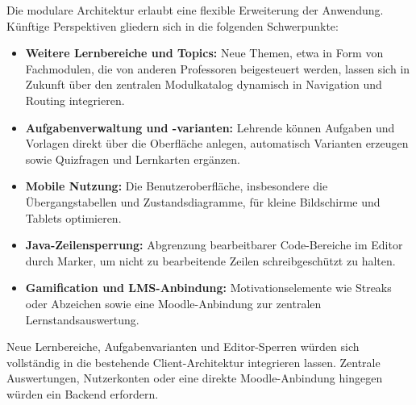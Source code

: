  \label{6_3_Perspektiven} \label{6_2_Perspektiven}

Die modulare Architektur erlaubt eine flexible Erweiterung der Anwendung. Künftige Perspektiven gliedern sich in die folgenden Schwerpunkte:

\begin{itemize}
    \item \textbf{Weitere Lernbereiche und Topics:} Neue Themen, etwa in Form von Fachmodulen, die von anderen Professoren beigesteuert werden, lassen sich in Zukunft über den zentralen Modulkatalog dynamisch in Navigation und Routing integrieren.
    \item \textbf{Aufgabenverwaltung und -varianten:} Lehrende können Aufgaben und Vorlagen direkt über die Oberfläche anlegen, automatisch Varianten erzeugen sowie Quizfragen und Lernkarten ergänzen.
    \item \textbf{Mobile Nutzung:} Die Benutzeroberfläche, insbesondere die Übergangstabellen und Zustandsdiagramme, für kleine Bildschirme und Tablets optimieren.
    \item \textbf{Java-Zeilensperrung:} Abgrenzung bearbeitbarer Code-Bereiche im Editor durch Marker, um nicht zu bearbeitende Zeilen schreibgeschützt zu halten.
    \item \textbf{Gamification und LMS-Anbindung:} Motivationselemente wie Streaks oder Abzeichen sowie eine Moodle-Anbindung zur zentralen Lernstandsauswertung.
\end{itemize}

Neue Lernbereiche, Aufgabenvarianten und Editor-Sperren würden sich vollständig in die bestehende Client-Architektur integrieren lassen. Zentrale Auswertungen, Nutzerkonten oder eine direkte Moodle-Anbindung hingegen würden ein Backend erfordern.
